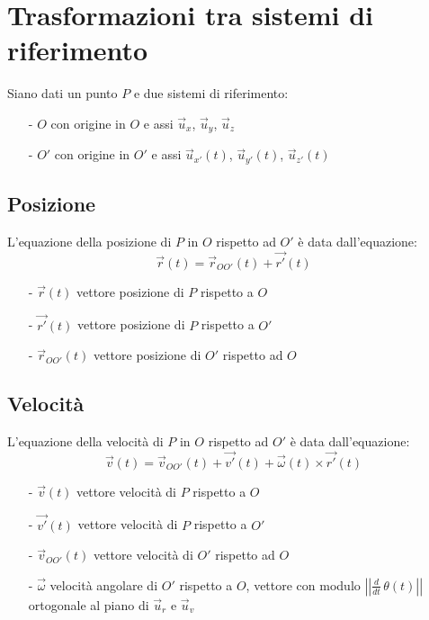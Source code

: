 \documentclass[a4paper]{article}
\newcommand\ux{\vec{u}_x}
\newcommand\uy{\vec{u}_y}
\newcommand\uz{\vec{u}_z}
\newcommand\uxp{\vec{u}_{x'}}
\newcommand\uyp{\vec{u}_{y'}}
\newcommand\uzp{\vec{u}_{z'}}
\newcommand\ur{\vec{u}_r}
\newcommand\uv{\vec{u}_v}
\newcommand\dt{\frac{d}{dt}\,}
\newcommand\vmod[1]{\left|\left|{#1}\right|\right|}
\begin{document}
\section{Trasformazioni tra sistemi di riferimento}
Siano dati un punto \(P\) e due sistemi di riferimento:
\begin{itemize}[topsep=3pt, itemsep=0pt]
	\item[-] \(O\) con origine in \(O\) e assi \(\ux\), \(\uy\), \(\uz\)
	\item[-] \(O'\) con origine in \(O'\) e assi \(\uxp(t)\), \(\uyp(t)\), \(\uzp(t)\)
\end{itemize}

\subsection{Posizione}
L'equazione della posizione di \(P\) in \(O\) rispetto ad \(O'\) è data dall'equazione:
\[\vec{r}(t) = \vec{r}_{OO'}(t) + \vec{r'}(t)\]
\begin{itemize}[topsep=3pt, itemsep=0pt]
	\item[-] \(\vec{r}(t)\) vettore posizione di \(P\) rispetto a \(O\)
	\item[-] \(\vec{r'}(t)\) vettore posizione di \(P\) rispetto a \(O'\)
	\item[-] \(\vec{r}_{OO'}(t)\) vettore posizione di \(O'\) rispetto ad \(O\)
\end{itemize}

\subsection{Velocità}
L'equazione della velocità di \(P\) in \(O\) rispetto ad \(O'\) è data dall'equazione:
\[\vec{v}(t) = \vec{v}_{OO'}(t) + \vec{v'}(t) + \vec{\omega}(t) \times \vec{r'}(t)\]
\begin{itemize}[topsep=3pt, itemsep=0pt]
	\item[-] \(\vec{v}(t)\) vettore velocità di \(P\) rispetto a \(O\)
	\item[-] \(\vec{v'}(t)\) vettore velocità di \(P\) rispetto a \(O'\)
	\item[-] \(\vec{v}_{OO'}(t)\) vettore velocità di \(O'\) rispetto ad \(O\)
	\item[-] \(\vec{\omega}\) velocità angolare di \(O'\) rispetto a \(O\), vettore con modulo \(\vmod{\dt \theta(t)}\) ortogonale al piano di \(\ur\) e \(\uv\)
\end{itemize}
\end{document}
